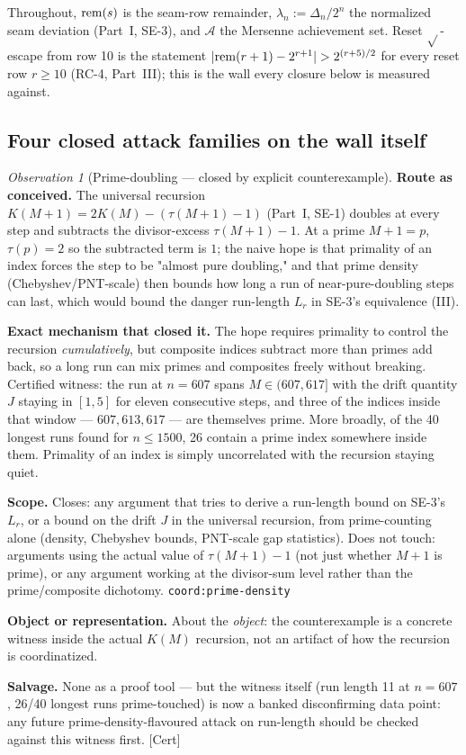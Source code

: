 \documentclass[11pt]{article}
\theoremstyle{plain}
\theoremstyle{definition}
\theoremstyle{remark}
\newtheorem{obs}[thm]{Observation}
\let\origmathrm\mathrm
\renewcommand{\mathrm}[1]{\ifmmode\origmathrm{#1}\else\textrm{#1}\fi}%
\newcommand{\ev}[1]{{\small\textsf{[#1]}}\xspace}
\newcommand{\coord}[1]{\texorpdfstring{{\small\nolinkurl{coord:#1}}}{coord:#1}\xspace}
\begin{document}
Throughout, $\mathrm{rem}(s)$ is the seam-row remainder, $\lambda_n := \Delta_n/2^n$ the normalized seam
deviation (Part~I, SE-3), and $\mathcal A$ the Mersenne achievement set. Reset $\sqrt{}$-escape
from row 10 is the statement $|\mathrm{rem}(r+1)-2^{r+1}| > 2^{(r+5)/2}$ for every reset row $r\ge 10$
(RC-4, Part~III); this is the wall every closure below is measured against.

\subsection{Four closed attack families on the wall itself}

\begin{obs}[Prime-doubling — closed by explicit counterexample]
\label{obs:prime-doubling}
\textbf{Route as conceived.} The universal recursion $K(M+1) = 2K(M) - (\tau(M+1)-1)$ (Part~I,
SE-1) doubles at every step and subtracts the divisor-excess $\tau(M+1)-1$. At a prime $M+1=p$,
$\tau(p)=2$ so the subtracted term is $1$; the naive hope is that primality of an index forces the
step to be "almost pure doubling," and that prime density (Chebyshev/PNT-scale) then bounds how
long a run of near-pure-doubling steps can last, which would bound the danger run-length $L_r$ in
SE-3's equivalence (III).

\textbf{Exact mechanism that closed it.} The hope requires primality to control the recursion
\emph{cumulatively}, but composite indices subtract more than primes add back, so a long run can
mix primes and composites freely without breaking. Certified witness: the run at $n=607$ spans
$M\in(607,617]$ with the drift quantity $J$ staying in $[1,5]$ for eleven consecutive steps, and
three of the indices inside that window — $607,613,617$ — are themselves prime. More broadly, of
the 40 longest runs found for $n\le 1500$, 26 contain a prime index somewhere inside them. Primality
of an index is simply uncorrelated with the recursion staying quiet.

\textbf{Scope.} Closes: any argument that tries to derive a run-length bound on SE-3's $L_r$, or a
bound on the drift $J$ in the universal recursion, from prime-counting alone (density,
Chebyshev bounds, PNT-scale gap statistics). Does not touch: arguments using the actual value of
$\tau(M+1)-1$ (not just whether $M+1$ is prime), or any argument working at the divisor-sum level
rather than the prime/composite dichotomy.
\coord{prime-density}

\textbf{Object or representation.} About the \emph{object}: the counterexample is a concrete
witness inside the actual $K(M)$ recursion, not an artifact of how the recursion is coordinatized.

\textbf{Salvage.} None as a proof tool — but the witness itself (run length 11 at $n=607$,
26/40 longest runs prime-touched) is now a banked disconfirming data point: any future
prime-density-flavoured attack on run-length should be checked against this witness first.
\ev{Cert}
\end{obs}
\end{document}
